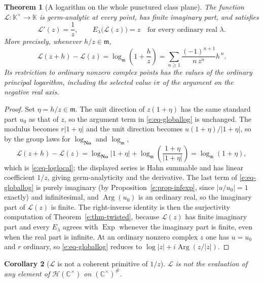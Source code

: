 \documentclass[11pt,a4paper]{article}
\numberwithin{equation}{section}
\newtheorem{theorem}{Theorem}[section]
\newtheorem{corollary}[theorem]{Corollary}
\theoremstyle{definition}
\theoremstyle{remark}
\theoremstyle{plain}
\newcommand{\K}{\mathbb K}
\newcommand{\No}{\mathbf{No}}
\newcommand{\CC}{\mathbb C}
\newcommand{\mm}{\mathfrak m}
\DeclareMathOperator{\Arg}{Arg}
\DeclareMathOperator{\Exp}{Exp}
\newcommand{\halo}[1]{#1^{\#}}
\newcommand{\Hc}{\mathcal H}
\newcommand{\abs}[1]{\lvert #1\rvert}
\begin{document}
\begin{theorem}[A logarithm on the whole punctured class plane]
\label{e:thm-globallog}
The function $\mathcal L:\K^{\times}\to\K$ is germ-analytic at every
point, has finite imaginary part, and satisfies
\[
 \mathcal L'(z)=\frac1z,
 \qquad E_\lambda\bigl(\mathcal L(z)\bigr)=z
 \quad\text{for every ordinary real }\lambda .
\]
More precisely, whenever $h/z\in\mm$,
\begin{equation}\label{e:eq-loglocal}
 \mathcal L(z+h)-\mathcal L(z)=\log_{\mm}\!\left(1+\frac hz\right)
 =\sum_{n\ge1}\frac{(-1)^{n+1}}{n\,z^{n}}h^{\,n}.
\end{equation}
Its restriction to ordinary nonzero complex points has the values of the
ordinary principal logarithm, including the selected value $i\pi$ of the
argument on the negative real axis.
\end{theorem}

\begin{proof}
Set $\eta=h/z\in\mm$.  The unit direction of $z(1+\eta)$ has the same
standard part $u_0$ as that of $z$, so the argument term in
\eqref{e:eq-globallog} is unchanged.  The modulus becomes $r\abs{1+\eta}$
and the unit direction becomes $u(1+\eta)/\abs{1+\eta}$, so by the group
laws for $\log_{\No}$ and $\log_{\mm}$,
\[
 \mathcal L(z+h)-\mathcal L(z)
 =\log_{\No}\abs{1+\eta}
  +\log_{\mm}\!\left(\frac{1+\eta}{\abs{1+\eta}}\right)
 =\log_{\mm}(1+\eta),
\]
which is \eqref{e:eq-loglocal}; the displayed series is Hahn summable and
has linear coefficient $1/z$, giving germ-analyticity and the derivative.
The last term of \eqref{e:eq-globallog} is purely imaginary (by
Proposition~\ref{e:prop-infexp}, since $\abs{u/u_0}=1$ exactly) and infinitesimal, and $\Arg(u_0)$ is an ordinary real, so
the imaginary part of $\mathcal L(z)$ is finite.  The right-inverse
identity is then the surjectivity computation of
Theorem~\ref{e:thm-twisted}, because $\mathcal L(z)$ has finite imaginary
part and every $E_\lambda$ agrees with $\Exp$ whenever the imaginary part
is finite, even when the real part is infinite.  At an
ordinary nonzero complex $z$ one has $u=u_0$ and $r$ ordinary, so
\eqref{e:eq-globallog} reduces to $\log\abs z+i\Arg(z/\abs z)$.
\end{proof}

\begin{corollary}[$\mathcal L$ is not a coherent primitive of $1/z$]
\label{e:cor-lognotcoherent}
$\mathcal L$ is not the evaluation of any element of
$\Hc(\CC^{\times})$ on $\halo{(\CC^{\times})}$.
\end{corollary}
\end{document}
